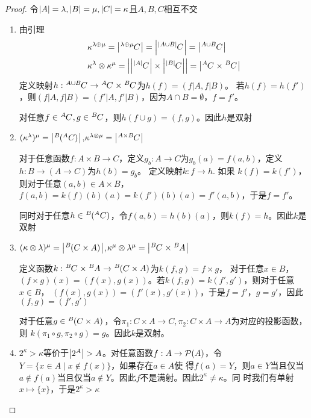 \documentclass[11pt]{article}
\begin{document}
\begin{proof}
令\(\abs{A}=\lambda,\abs{B}=\mu,\abs{C}=\kappa\)且\(A,B,C\)相互不交
\begin{enumerate}
\item 由引理
\begin{align*}
&\kappa^{\lambda\oplus\mu}=\abs{\tensor[^{\lambda\oplus\mu}]{C}{}}=\abs{\tensor[^{\abs{A\cup B}}]{C}{}}=\abs{\tensor[^{A\cup B}]{C}{}}\\
&\kappa^\lambda\otimes\kappa^\mu=\abs{\abs{\tensor[^{\abs{A}}]{C}{}}\times\abs{\tensor[^{\abs{B}}]{C}{}}}=
 \abs{\tensor[^A]{C}{}\times\tensor[^B]{C}{}}
\end{align*}
定义映射\(h:\tensor[^{A\cup B}]{C}{}\to\tensor[^A]{C}{}\times\tensor[^B]{C}{}\)为\(h(f)=(f|A,f|B)\)。
若\(h(f)=h(f')\)，则\((f|A,f|B)=(f'|A,f'|B)\)，因为\(A\cap B=\emptyset\)，\(f=f'\)。

对任意\(f\in\tensor[^A]{C}{},g\in\tensor[^B]{C}{}\)，则\(h(f\cup g)=(f,g)\)。因此\(h\)是双射

\item \((\kappa^\lambda)^\mu=\abs{\tensor[^B]{(^AC)}{}}\),\(\kappa^{\lambda\otimes\mu}=\abs{\tensor[^{A\times B}]{C}{}}\)

对于任意函数\(f:A\times B\to C\)，定义\(g_b:A\to C\)为\(g_b(a)=f(a,b)\)，定义\(h:B\to(A\to C)\)为\(h(b)=g_b\)。
定义映射\(k:f\to h\). 如果 \(k(f)=k(f')\)，则对于任意\((a,b)\in A\times B\)，
\(f(a,b)=k(f)(b)(a)=k(f')(b)(a)=f'(a,b)\)，于是\(f=f'\)。

同时对于任意\(h\in\tensor[^B]{(^AC)}{}\)，令\(f(a,b)=h(b)(a)\)，则\(k(f)=h\)。因此\(k\)是双射

\item \((\kappa\otimes\lambda)^\mu=\abs{\tensor[^B]{(C\times A)}{}}\),\(\kappa^\mu\otimes\lambda^\mu=\abs{\tensor[^B]{C}{}\times\tensor[^B]{A}{}}\)

定义函数\(k:\tensor[^B]{C}{}\times\tensor[^B]{A}{}\to\tensor[^B]{(C\times A)}{}\)为\(k(f,g)=f\times g\)，
对于任意\(x\in B\)，\((f\times g)(x)=(f(x),g(x))\)。若\(k(f,g)=k(f',g')\)，则对于任意\(x\in B\)，
\((f(x),g(x))=(f'(x),g'(x))\)，于是\(f=f'\)，\(g=g'\)，因此\((f,g)=(f',g')\)

对于任意\(g\in\tensor[^B]{(C\times A)}{}\)，令\(\pi_1:C\times A\to C,\pi_2:C\times A\to A\)为对应的投影函数，则
\(k(\pi_1\circ g,\pi_2\circ g)=g\)。因此\(k\)是双射。

\item \(2^\kappa>\kappa\)等价于\(\abs{2^A}>A\)。对任意函数\(f:A\to\mathcal{P}(A)\)，令\(Y=\{x\in A\mid x\notin f(x)\}\)，如果存在\(a\in A\)使
得\(f(a)=Y\)，则\(a\in Y\)当且仅当\(a\notin f(a)\)当且仅当\(a\notin Y\)。因此\(f\)不是满射。因此\(2^\kappa\neq\kappa\)。同
时我们有单射\(x\mapsto\{x\}\)，于是\(2^\kappa>\kappa\)
\end{enumerate}
\end{proof}
\end{document}
